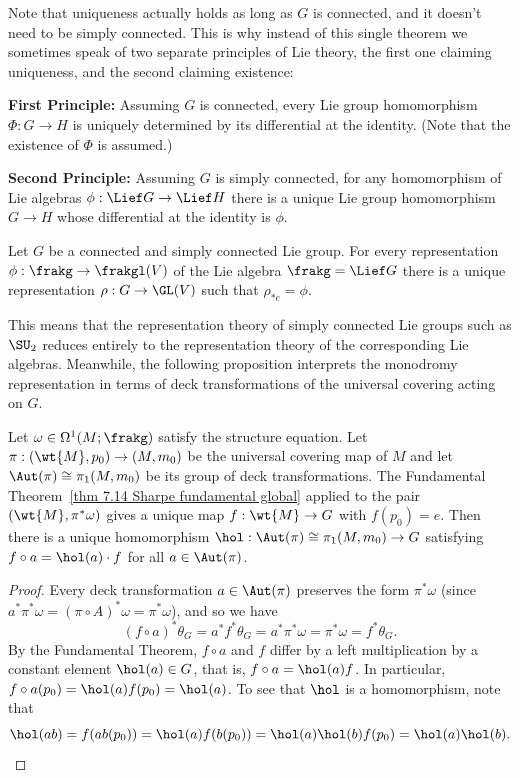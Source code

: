 \begin{rem}\label{rem Lie's principles}
    Note that uniqueness actually holds as long as $G$ is connected, and it doesn't need to be simply connected. This is why instead of this single theorem we sometimes speak of two separate principles of Lie theory, the first one claiming uniqueness, and the second claiming existence:

    \textbf{First Principle:} Assuming $G$ is connected, every Lie group homomorphism $\varPhi:G\to H$ is uniquely determined by its differential at the identity. (Note that the existence of $\varPhi$ is assumed.)

    \textbf{Second Principle:} Assuming $G$ is simply connected, for any homomorphism of Lie algebras $\phi:\Lief G\to \Lief H$ there is a unique Lie group homomorphism $G\to H$ whose differential at the identity is $\phi$.
\end{rem}

\begin{cor}\label{cor generated homomorphism}
    Let $G$ be a connected and simply connected Lie group. For every representation $\phi:\frakg\to \frakgl(V)$ of the Lie algebra $\frakg=\Lief G$ there is a unique representation $\rho:G\to \GL(V)$ such that $\rho_{\ast e}=\phi$.
\end{cor}

This means that the representation theory of simply connected Lie groups such as $\SU_2$ reduces entirely to the representation theory of the corresponding Lie algebras. Meanwhile, the following proposition interprets the monodromy representation in terms of deck transformations of the universal covering acting on $G$.

\begin{prop}\label{prop 8.1 Sharpe}
    Let $\omega\in\Omega^1(M;\frakg)$ satisfy the structure equation. Let $\pi:(\wt{M},p_0)\to (M,m_0)$ be the universal covering map of $M$ and let $\Aut(\pi)\cong \pi_1(M,m_0)$ be its group of deck transformations. The Fundamental Theorem~\ref{thm 7.14 Sharpe fundamental global} applied to the pair $(\wt{M},\pi^\ast\omega)$ gives a unique map $f:\wt{M}\to G$ with $f(p_0)=e$. Then there is a unique homomorphism $\hol: \Aut(\pi)\cong\pi_1(M,m_0)\to G$ satisfying $f\circ a=\hol(a)\cdot f$ for all $a\in\Aut(\pi)$.
\end{prop}
\begin{proof}
    Every deck transformation $a\in \Aut(\pi)$ preserves the form $\pi^\ast\omega$ (since $a^\ast \pi^\ast\omega=(\pi\circ A)^\ast\omega=\pi^\ast\omega$), and so we have
    \[(f\circ a)^\ast\theta_G=a^\ast f^\ast\theta_G=a^\ast \pi^\ast\omega=\pi^\ast\omega=f^\ast\theta_G.\]
    By the Fundamental Theorem, $f\circ a$ and $f$ differ by a left multiplication by a constant element $\hol(a)\in G$, that is, $f\circ a=\hol(a)f$. In particular, $f\circ a(p_0)=\hol(a)f(p_0)=\hol(a)$. To see that $\hol$ is a homomorphism, note that 
    \[\hol(ab)=f(ab(p_0))=\hol(a)f(b(p_0))=\hol(a)\hol(b)f(p_0)=\hol(a)\hol(b).\]
\end{proof}

